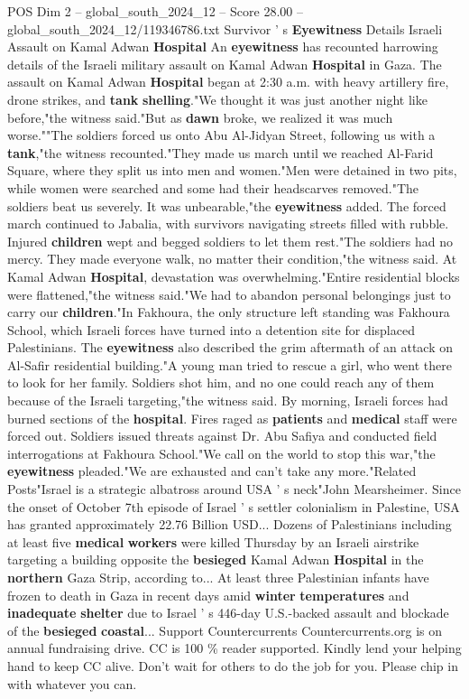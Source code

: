 \begin{textsample}{POS Dim 2 – global\_south\_2024\_12 – Score 28.00 – global\_south\_2024\_12/119346786.txt}
Survivor ' s \textbf{Eyewitness} Details Israeli Assault on Kamal Adwan \textbf{Hospital} An \textbf{eyewitness} has recounted harrowing details of the Israeli military assault on Kamal Adwan \textbf{Hospital} in Gaza.
The assault on Kamal Adwan \textbf{Hospital} began at 2:30 a.m. with heavy artillery fire, drone strikes, and \textbf{tank} \textbf{shelling}."We thought it was just another night like before,"the witness said."But as \textbf{dawn} broke, we realized it was much worse.""The soldiers forced us onto Abu Al-Jidyan Street, following us with a \textbf{tank},"the witness recounted."They made us march until we reached Al-Farid Square, where they split us into men and women."Men were detained in two pits, while women were searched and some had their headscarves removed."The soldiers beat us severely.
It was unbearable,"the \textbf{eyewitness} added.
The forced march continued to Jabalia, with survivors navigating streets filled with rubble.
Injured \textbf{children} wept and begged soldiers to let them rest."The soldiers had no mercy.
They made everyone walk, no matter their condition,"the witness said.
At Kamal Adwan \textbf{Hospital}, devastation was overwhelming."Entire residential blocks were flattened,"the witness said."We had to abandon personal belongings just to carry our \textbf{children}."In Fakhoura, the only structure left standing was Fakhoura School, which Israeli forces have turned into a detention site for displaced Palestinians.
The \textbf{eyewitness} also described the grim aftermath of an attack on Al-Safir residential building."A young man tried to rescue a girl, who went there to look for her family.
Soldiers shot him, and no one could reach any of them because of the Israeli targeting,"the witness said.
By morning, Israeli forces had burned sections of the \textbf{hospital}.
Fires raged as \textbf{patients} and \textbf{medical} staff were forced out.
Soldiers issued threats against Dr.
Abu Safiya and conducted field interrogations at Fakhoura School."We call on the world to stop this war,"the \textbf{eyewitness} pleaded."We are exhausted and can't take any more."Related Posts"Israel is a strategic albatross around USA ' s neck"John Mearsheimer.
Since the onset of October 7th episode of Israel ' s settler colonialism in Palestine, USA has granted approximately 22.76 Billion USD...
Dozens of Palestinians including at least five \textbf{medical} \textbf{workers} were killed Thursday by an Israeli airstrike targeting a building opposite the \textbf{besieged} Kamal Adwan \textbf{Hospital} in the \textbf{northern} Gaza Strip, according to...
At least three Palestinian infants have frozen to death in Gaza in recent days amid \textbf{winter} \textbf{temperatures} and \textbf{inadequate} \textbf{shelter} due to Israel ' s 446-day U.S.-backed assault and blockade of the \textbf{besieged} \textbf{coastal}...
Support Countercurrents Countercurrents.org is on annual fundraising drive.
CC is 100 \% reader supported.
Kindly lend your helping hand to keep CC alive.
Don't wait for others to do the job for you.
Please chip in with whatever you can.


\end{textsample}
